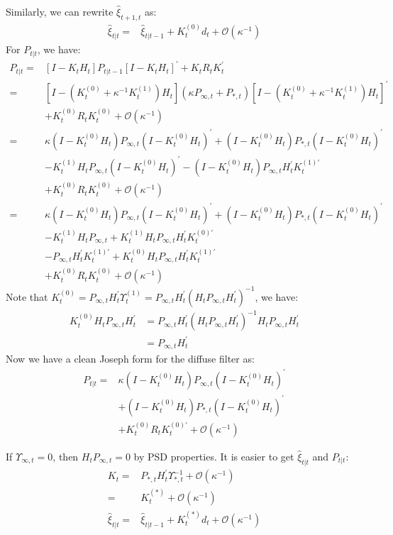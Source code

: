 \documentclass[10pt]{article}
\numberwithin{equation}{section}
\begin{document}
Similarly, we can rewrite $\hat{\xi}_{t+1,t}$ as:
\begin{align}
    \hat{\xi}_{t|t} =& \hat{\xi}_{t|t-1} + K_t^{(0)}d_t + \mathcal{O}(\kappa^{-1}) \label{eq:diff_xi1} 
\end{align}
For $P_{t|t}$, we have:
\begin{align*}
    P_{t|t} =& [I-K_tH_t]P_{t|t-1}[I-K_tH_t]^{'}+K_tR_tK_t^{'} \\
    =& [I-(K_t^{(0)}+\kappa^{-1}K_t^{(1)})H_t](\kappa P_{\infty,t}+P_{*,t})[I-(K_t^{(0)}+\kappa^{-1}K_t^{(1)})H_t]^{'} \\ 
    &+ K_t^{(0)}R_tK_t^{(0)} + \mathcal{O}(\kappa^{-1}) \\
    =& \kappa(I-K_t^{(0)}H_t)P_{\infty,t}(I-K_t^{(0)}H_t)^{'} + (I-K_t^{(0)}H_t)P_{*,t}(I-K_t^{(0)}H_t)^{'} \\
    &-K_t^{(1)}H_tP_{\infty,t}(I-K_t^{(0)}H_t)^{'} - (I-K_t^{(0)}H_t)P_{\infty,t}H_t^{'}K_t^{(1)'} \\
    &+ K_t^{(0)}R_tK_t^{(0)} + \mathcal{O}(\kappa^{-1}) \\
    =& \kappa(I-K_t^{(0)}H_t)P_{\infty,t}(I-K_t^{(0)}H_t)^{'} + (I-K_t^{(0)}H_t)P_{*,t}(I-K_t^{(0)}H_t)^{'} \\
    &-K_t^{(1)}H_tP_{\infty,t} + K_t^{(1)}H_tP_{\infty,t}H_t^{'}K_t^{(0)'} \\
    &- P_{\infty,t}H_t^{'}K_t^{(1)'} + K_t^{(0)}H_tP_{\infty,t}H_t^{'}K_t^{(1)'}  \\
    &+ K_t^{(0)}R_tK_t^{(0)} + \mathcal{O}(\kappa^{-1}) 
\end{align*}
Note that $K_t^{(0)} = P_{\infty,t}H_t^{'}\Upsilon_t^{(1)} = P_{\infty,t}H_t^{'}(H_tP_{\infty,t}H_t^{'})^{-1}$, we have:
\begin{align*}
    K_t^{(0)}H_tP_{\infty,t}H_t^{'} &= P_{\infty,t}H_t^{'}(H_tP_{\infty,t}H_t^{'})^{-1}H_tP_{\infty,t}H_t^{'} \\
    &= P_{\infty,t}H_t^{'}
\end{align*}
Now we have a clean Joseph form for the diffuse filter as:
\begin{align}
    P_{t|t}=& \kappa (I-K_t^{(0)}H_t)P_{\infty,t}(I-K_t^{(0)}H_t)^{'} \label{eq:diff_P1} \\
    &+(I-K_t^{(0)}H_t)P_{*,t}(I-K_t^{(0)}H_t)^{'} \nonumber \\
    &+K_t^{(0)}R_tK_t^{(0)'} + \mathcal{O}(\kappa^{-1}) \nonumber
\end{align}

If $\Upsilon_{\infty,t}=0$, then $H_tP_{\infty,t}=0$ by PSD properties. It is easier to get $\hat{\xi}_{t|t}$ and $P_{t|t}$:
\begin{align}
    K_t =& P_{*,t}H_t^{'}\Upsilon_{*,t}^{-1} + \mathcal{O}(\kappa^{-1}) \nonumber \\
    =& K_t^{(*)} + \mathcal{O}(\kappa^{-1}) \label{eq:K2_diffuse} \\
    \hat{\xi}_{t|t} =& \hat{\xi}_{t|t-1} + K_t^{(*)}d_t + \mathcal{O}(\kappa^{-1}) \label{eq:diff_xi2} 
\end{align}
\end{document}
